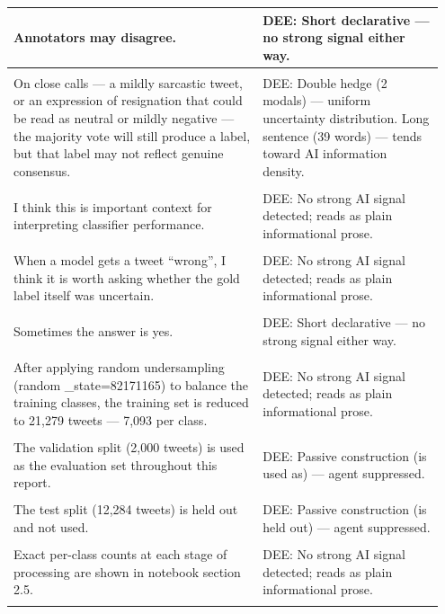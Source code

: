 \documentclass[11pt]{article}
\begin{document}
\begin{longtable}{|p{0.55\linewidth}|p{0.40\linewidth}|}
\hline
Annotators may disagree. & DEE: Short declarative --- no strong signal either way. \\[2pt]
\hline
\rule{0pt}{3.5cm} & \\
\hline
On close calls --- a mildly sarcastic tweet, or an expression of resignation that could be read as neutral or mildly negative --- the majority vote will still produce a label, but that label may not reflect genuine consensus. & DEE: Double hedge (2 modals) --- uniform uncertainty distribution. Long sentence (39 words) --- tends toward AI information density. \\[2pt]
\hline
\rule{0pt}{3.5cm} & \\
\hline
I think this is important context for interpreting classifier performance. & DEE: No strong AI signal detected; reads as plain informational prose. \\[2pt]
\hline
\rule{0pt}{3.5cm} & \\
\hline
When a model gets a tweet ``wrong'', I think it is worth asking whether the gold label itself was uncertain. & DEE: No strong AI signal detected; reads as plain informational prose. \\[2pt]
\hline
\rule{0pt}{3.5cm} & \\
\hline
Sometimes the answer is yes. & DEE: Short declarative --- no strong signal either way. \\[2pt]
\hline
\rule{0pt}{3.5cm} & \\
\hline
After applying random undersampling (random \_state=82171165) to balance the training classes, the training set is reduced to 21,279 tweets --- 7,093 per class. & DEE: No strong AI signal detected; reads as plain informational prose. \\[2pt]
\hline
\rule{0pt}{3.5cm} & \\
\hline
The validation split (2,000 tweets) is used as the evaluation set throughout this report. & DEE: Passive construction (is used as) --- agent suppressed. \\[2pt]
\hline
\rule{0pt}{3.5cm} & \\
\hline
The test split (12,284 tweets) is held out and not used. & DEE: Passive construction (is held out) --- agent suppressed. \\[2pt]
\hline
\rule{0pt}{3.5cm} & \\
\hline
Exact per-class counts at each stage of processing are shown in notebook section 2.5. & DEE: No strong AI signal detected; reads as plain informational prose. \\[2pt]
\hline
\rule{0pt}{3.5cm} & \\

\end{longtable}
\end{document}

